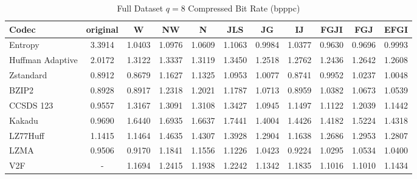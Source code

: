 \documentclass{article}
\begin{document}
\begin{table}[h!]
\centering
\caption{Full Dataset $q=8$ Compressed Bit Rate (bpppc)}
\begin{tabular}{|l|cccccccccc|}
\hline
Codec &  original &      W &     NW &      N &    JLS &     JG &     IJ &   FGJI &    FGJ &   EFGI \\
\hline
Entropy & 3.3914 & 1.0403 & 1.0976 & 1.0609 & 1.1063 & 0.9984 & 1.0377 & 0.9630 & 0.9696 & 0.9993 \\
\hline
Huffman Adaptive &    2.0172 & 1.3122 & 1.3337 & 1.3119 & 1.3450 & 1.2518 & 1.2762 & 1.2436 & 1.2642 & 1.2608 \\
Zstandard        &    0.8912 & 0.8679 & 1.1627 & 1.1325 & 1.0953 & 1.0077 & 0.8741 & 0.9952 & 1.0237 & 1.0048 \\
BZIP2            &    0.8928 & 0.8917 & 1.2318 & 1.2021 & 1.1787 & 1.0713 & 0.8959 & 1.0382 & 1.0673 & 1.0539 \\
CCSDS 123        &    0.9557 & 1.3167 & 1.3091 & 1.3108 & 1.3427 & 1.0945 & 1.1497 & 1.1122 & 1.2039 & 1.1442 \\
Kakadu           &    0.9690 & 1.6440 & 1.6935 & 1.6637 & 1.7441 & 1.4004 & 1.4426 & 1.4182 & 1.5224 & 1.4318 \\
LZ77Huff         &    1.1415 & 1.1464 & 1.4635 & 1.4307 & 1.3928 & 1.2904 & 1.1638 & 1.2686 & 1.2953 & 1.2807 \\
LZMA             &    0.9506 & 0.9170 & 1.1841 & 1.1556 & 1.1226 & 1.0423 & 0.9224 & 1.0295 & 1.0534 & 1.0400 \\
V2F              &   - & 1.1694 & 1.2415 & 1.1938 & 1.2242 & 1.1342 & 1.1835 & 1.1016 & 1.1010 & 1.1434 \\
\hline
\end{tabular}
\end{table}
\end{document}

